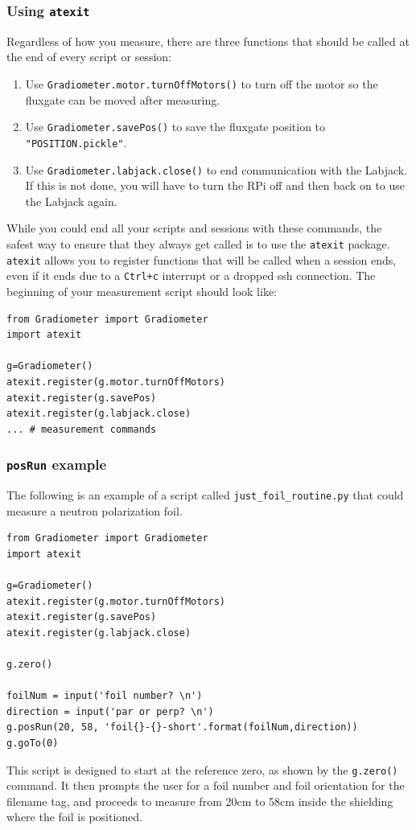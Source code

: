 \documentclass{TheMartianReport}
\newcommand{\pyinline}[1]{\texttt{#1}}
\newcommand{\shellinline}[1]{\texttt{#1}}
\begin{document}
\subsubsection{Using \pyinline{atexit}}
Regardless of how you measure, there are three functions that should be called at the end of every script or session:
\begin{enumerate}
	\item Use \pyinline{Gradiometer.motor.turnOffMotors()} to turn off the motor so the fluxgate can be moved after measuring.
	\item Use \pyinline{Gradiometer.savePos()} to save the fluxgate position to \shellinline{"POSITION.pickle"}.
	\item Use \pyinline{Gradiometer.labjack.close()} to end communication with the Labjack. If this is not done, you will have to turn the RPi off and then back on to use the Labjack again.
\end{enumerate}
While you could end all your scripts and sessions with these commands, the safest way to ensure that they always get called is to use the \pyinline{atexit} package. \pyinline{atexit} allows you to register functions that will be called when a session ends, even if it ends due to a \shellinline{Ctrl+c} interrupt or a dropped ssh connection. The beginning of your measurement script should look like:
\begin{verbatim}
from Gradiometer import Gradiometer
import atexit

g=Gradiometer()
atexit.register(g.motor.turnOffMotors)
atexit.register(g.savePos)
atexit.register(g.labjack.close)
... # measurement commands
\end{verbatim}

\subsubsection{\pyinline{posRun} example}
The following is an example of a script called \shellinline{just_foil_routine.py} that could measure a neutron polarization foil.
\begin{verbatim}
from Gradiometer import Gradiometer
import atexit

g=Gradiometer()
atexit.register(g.motor.turnOffMotors)
atexit.register(g.savePos)
atexit.register(g.labjack.close)

g.zero()

foilNum = input('foil number? \n')
direction = input('par or perp? \n')
g.posRun(20, 58, 'foil{}-{}-short'.format(foilNum,direction))
g.goTo(0)
\end{verbatim}
This script is designed to start at the reference zero, as shown by the \pyinline{g.zero()} command. It then prompts the user for a foil number and foil orientation for the filename tag, and proceeds to measure from 20cm to 58cm inside the shielding where the foil is positioned.
\end{document}
